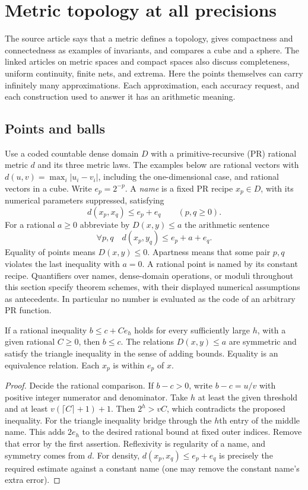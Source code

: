 \section{Metric topology at all precisions}
\label{sec:metric-names}

The source article says that a metric defines a topology, gives compactness and
connectedness as examples of invariants, and compares a cube and a sphere.
The linked articles on metric spaces and compact spaces also discuss completeness,
uniform continuity, finite nets, and extrema. Here the points themselves can carry
infinitely many approximations. Each approximation, each accuracy request, and
each construction used to answer it has an arithmetic meaning.

\subsection{Points and balls}

Use a coded countable dense domain $D$ with a primitive-recursive (PR)
rational metric $d$ and its three metric laws. The examples below are rational
vectors with $d(u,v)=\max_i |u_i-v_i|$, including the one-dimensional case,
and rational vectors in a cube. Write $e_p=2^{-p}$. A \emph{name} is a fixed PR
recipe $x_p\in D$, with its numerical parameters suppressed, satisfying
\[
 d(x_p,x_q)\le e_p+e_q\qquad(p,q\ge0).
\]
For a rational $a\ge0$ abbreviate by $D(x,y)\le a$ the arithmetic sentence
\[
 \forall p,q\quad d(x_p,y_q)\le e_p+a+e_q .
\]
Equality of points means $D(x,y)\le0$. Apartness means that some pair
$p,q$ violates the last inequality with $a=0$. A rational point is named by
its constant recipe. Quantifiers over names, dense-domain operations, or
moduli throughout this section specify theorem schemes, with their displayed
numerical assumptions as antecedents. In particular no number is evaluated as
the code of an arbitrary PR function.

\begin{lemma}\label{idx-metric32}
If a rational inequality $b\le c+C e_h$ holds for every sufficiently large
$h$, with a given rational $C\ge0$, then $b\le c$. The relations
$D(x,y)\le a$ are symmetric and satisfy the triangle inequality in the sense
of adding bounds. Equality is an equivalence relation. Each $x_p$ is within
$e_p$ of $x$.
\end{lemma}
\begin{proof}
Decide the rational comparison. If $b-c>0$, write $b-c=u/v$ with positive
integer numerator and denominator. Take $h$ at least the given threshold and
at least $v(\lceil C\rceil+1)+1$. Then $2^h>vC$, which contradicts
the proposed inequality. For the triangle inequality bridge through the
$h$th entry of the middle name. This adds $2e_h$ to the desired rational
bound at fixed outer indices. Remove that error by the first assertion.
Reflexivity is regularity of a name, and symmetry comes from $d$. For density,
$d(x_p,x_q)\le e_p+e_q$ is precisely the required estimate against a
constant name (one may remove the constant name's extra error).
\end{proof}

